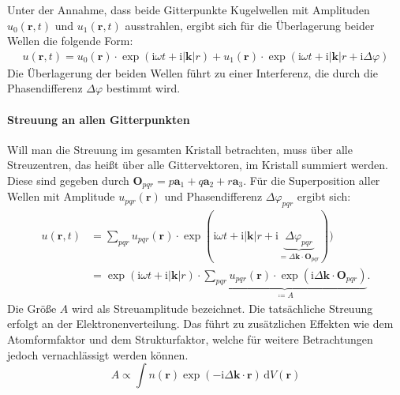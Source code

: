 Unter der Annahme, dass beide Gitterpunkte Kugelwellen mit Amplituden $u_{0}(\mathbf{r}, t)$ und $u_{1}(\mathbf{r}, t)$
ausstrahlen, ergibt sich für die Überlagerung beider Wellen die folgende Form:
\begin{align}
    u(\mathbf{r},t)=u_{0}(\mathbf{r})\cdot \exp(\mathrm{i}\omega t+\mathrm{i}\lvert \mathbf{k}
    \rvert r) + u_{1}(\mathbf{r}) \cdot \exp(\mathrm{i}\omega t + \mathrm{i}\lvert \mathbf{k}
    \rvert r+\mathrm{i}\Delta\varphi)
\end{align}
Die Überlagerung der beiden Wellen führt zu einer Interferenz, die durch die Phasendifferenz $\Delta\varphi$ bestimmt
wird.

\paragraph{Streuung an allen Gitterpunkten}
Will man die Streuung im gesamten Kristall betrachten, muss über alle Streuzentren, das heißt über alle Gittervektoren,
im Kristall summiert werden.
Diese sind gegeben durch $\mathbf{O}_{pqr}=p\mathbf{a}_{1}+q\mathbf{a}_{2}+r\mathbf{a}_{3}$.
Für die Superposition aller Wellen mit Amplitude $u_{pqr}(\mathbf{r})$ und Phasendifferenz $\Delta\varphi_{pqr}$
ergibt sich:
\begin{align}
    u(\mathbf{r}, t)
    &=\sum_{pqr} u_{pqr}(\mathbf{r})\cdot \exp(\mathrm{i}\omega t+\mathrm{i}
    \lvert \mathbf{k} \rvert r+\mathrm{i}\underbrace{ \Delta\varphi_{pqr} }_{ = \Delta
    \mathbf{k}\cdot \mathbf{O}_{pqr}})) \\
    &=\exp(\mathrm{i}\omega t+\mathrm{i}\lvert \mathbf{k} \rvert r)\cdot
    \underbrace{ \sum_{pqr}u_{pqr}(\mathbf{r})\cdot \exp(\mathrm{i}\Delta \mathbf{k}
    \cdot \mathbf{O}_{pqr}) }_{ \coloneqq A }.
    \label{eq:amplitude}
\end{align}
Die Größe $A$ wird als Streuamplitude bezeichnet.
Die tatsächliche Streuung erfolgt an der Elektronenverteilung.
Das führt zu zusätzlichen Effekten wie dem Atomformfaktor und dem Strukturfaktor,
welche für weitere Betrachtungen jedoch vernachlässigt werden können.
\begin{equation*}
    A \propto \int n(\mathbf{r}) \exp(-\mathrm{i} \Delta \mathbf{k}\cdot
    \mathbf{r}) \, \mathrm{d}V(\mathbf{r})
\end{equation*}

